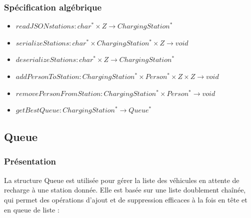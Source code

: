 \documentclass[french,a4paper]{article}
\begin{document}
    \subsubsection{Spécification algébrique}

    \begin{itemize}
        \item $readJSONstations : char^* \times {Z} \rightarrow ChargingStation^*$
        \item $serializeStations : char^* \times ChargingStation^* \times {Z} \rightarrow void$
        \item $deserializeStations : char^* \times {Z} \rightarrow ChargingStation^*$
        \item $addPersonToStation : ChargingStation^* \times Person^* \times {Z} \times {Z} \rightarrow void$
        \item $removePersonFromStation : ChargingStation^* \times Person^* \rightarrow void$
        \item $getBestQueue : ChargingStation^* \rightarrow Queue^*$
    \end{itemize}


    \subsection{Queue}

    \subsubsection{Présentation}
    La structure Queue est utilisée pour gérer la liste des véhicules en attente de recharge à une station donnée. Elle est basée sur une liste doublement chaînée, qui permet des opérations d'ajout et de suppression efficaces à la fois en tête et en queue de liste :

    \begin{center}
    \end{center}
\end{document}
